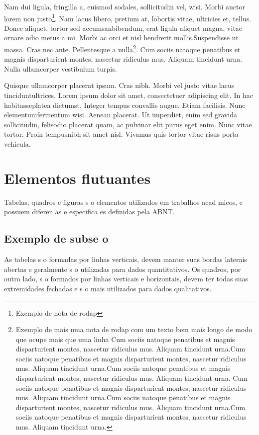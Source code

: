 \documentclass{article}
\begin{document}
Nam dui ligula, fringilla a, euismod sodales, sollicitudin vel, wisi. Morbi auctor lorem non justo\footnote{Exemplo de nota de rodap  }. Nam lacus libero, pretium at, lobortis vitae, ultricies et, tellus.  Donec aliquet, tortor sed accumsanbibendum, erat ligula aliquet magna, vitae ornare odio metus a mi. Morbi ac orci et nisl hendrerit mollis.Suspendisse ut massa. Cras nec ante. Pellentesque a nulla\footnote{Exemplo de mais uma nota de rodap  com um texto bem mais longo de modo que ocupe mais que uma linha Cum sociis natoque penatibus et magnis disparturient montes, nascetur ridiculus mus. Aliquam tincidunt urna.Cum sociis natoque penatibus et magnis disparturient montes, nascetur ridiculus mus. Aliquam tincidunt urna.Cum sociis natoque penatibus et magnis disparturient montes, nascetur ridiculus mus. Aliquam tincidunt urna. Cum sociis natoque penatibus et magnis disparturient montes, nascetur ridiculus mus. Aliquam tincidunt urna.Cum sociis natoque penatibus et magnis disparturient montes, nascetur ridiculus mus. Aliquam tincidunt urna.Cum sociis natoque penatibus et magnis disparturient montes, nascetur ridiculus mus. Aliquam tincidunt urna.}. Cum sociis natoque penatibus et magnis disparturient montes, nascetur ridiculus mus. Aliquam tincidunt urna. Nulla ullamcorper vestibulum turpis. 
\begin{citacao}
 Quisque ullamcorper placerat ipsum. Cras nibh. Morbi vel justo vitae lacus tinciduntultrices.  Lorem ipsum dolor sit amet, consectetuer adipiscing elit.  In hac habitasseplatea dictumst.  Integer tempus convallis augue.  Etiam facilisis.  Nunc elementumfermentum wisi.  Aenean placerat.  Ut imperdiet, enim sed gravida sollicitudin, felisodio placerat quam, ac pulvinar elit purus eget enim. Nunc vitae tortor. Proin tempusnibh sit amet nisl. Vivamus quis tortor vitae risus porta vehicula.
\end{citacao}

\lipsum[5]

\section{Elementos flutuantes}
Tabelas, quadros e figuras s o elementos utilizados em trabalhos acad micos, e possuem diferen as e especifica es definidas pela ABNT.

\subsection{Exemplo de subse o}
As tabelas s o formadas por linhas verticais, devem manter suas bordas laterais abertas e geralmente s o utilizadas para dados quantitativos. Os quadros, por outro lado, s o formados por linhas verticais e horizontais, devem ter todas suas extremidades fechadas e s o mais utilizados para dados qualitativos.
\end{document}

